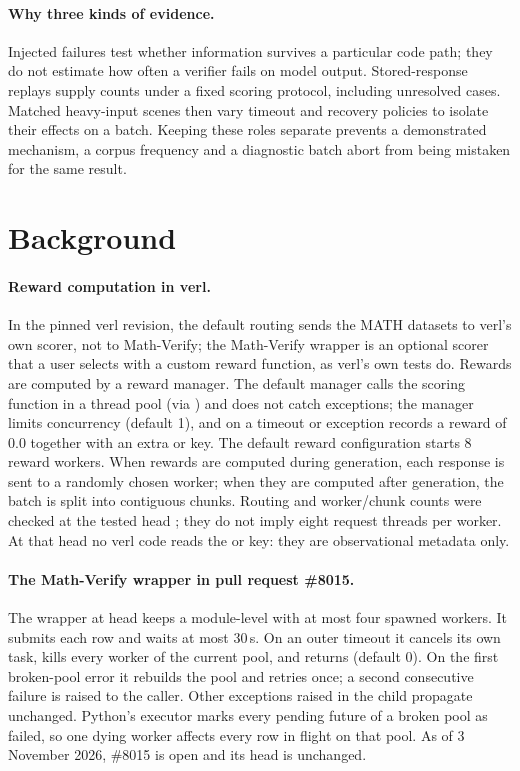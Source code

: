 \documentclass[11pt,a4paper]{article}
\newcommand{\pr}[1]{\#{#1}}
\begin{document}
\paragraph{Why three kinds of evidence.} Injected failures test whether information survives a particular code path; they do not estimate how often a verifier fails on model output. Stored-response replays supply counts under a fixed scoring protocol, including unresolved cases. Matched heavy-input scenes then vary timeout and recovery policies to isolate their effects on a batch. Keeping these roles separate prevents a demonstrated mechanism, a corpus frequency and a diagnostic batch abort from being mistaken for the same result.

\section{Background}
\paragraph{Reward computation in verl.} In the pinned verl revision, the default routing sends the MATH datasets to verl's own  scorer, not to Math-Verify; the Math-Verify wrapper is an optional scorer that a user selects with a custom reward function, as verl's own tests do. Rewards are computed by a reward manager. The default  manager calls the scoring function in a thread pool (via ) and does not catch exceptions; the  manager limits concurrency (default 1), and on a timeout or exception records a reward of 0.0 together with an extra  or  key. The default reward configuration starts 8 reward workers. When rewards are computed during generation, each response is sent to a randomly chosen worker; when they are computed after generation, the batch is split into contiguous chunks. Routing and worker/chunk counts were checked at the tested head ; they do not imply eight request threads per worker. At that head no verl code reads the  or  key: they are observational metadata only.

\paragraph{The Math-Verify wrapper in pull request \pr{8015}.} The wrapper at head  keeps a module-level  with at most four spawned workers. It submits each row and waits at most 30\,s. On an outer timeout it cancels its own task, kills every worker of the current pool, and returns  (default 0). On the first broken-pool error it rebuilds the pool and retries once; a second consecutive failure is raised to the caller. Other exceptions raised in the child propagate unchanged. Python's executor marks every pending future of a broken pool as failed, so one dying worker affects every row in flight on that pool. As of 3 November 2026, \pr{8015} is open and its head is unchanged.
\end{document}
